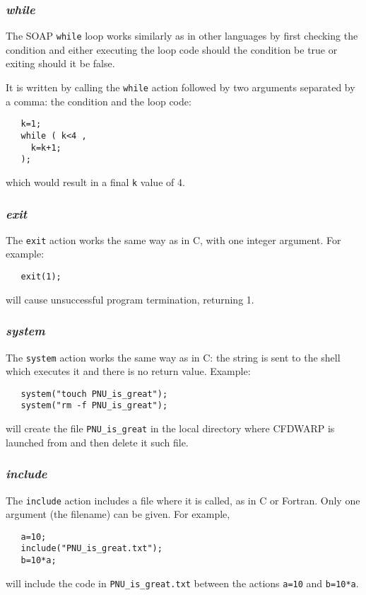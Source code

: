\documentclass{warpdoc}
\begin{document}
\subsubsection{\emph{while}}

The SOAP \verb|while| loop works similarly as in other languages
by first checking the condition and
either executing the loop code should the condition be true or exiting
should it be false.

It is written by calling the \verb|while| action followed by
two arguments separated by a comma: the condition and the loop code:
%
\begin{verbatim}
   k=1;
   while ( k<4 ,
     k=k+1;
   );
\end{verbatim}
%
which would result in a final \verb|k| value of 4.


\subsubsection{\emph{exit}}

The \verb|exit| action works the same way as in C, with one integer
argument. For example:
%
\begin{verbatim}
   exit(1);
\end{verbatim}
%
will cause unsuccessful program termination, returning 1.


\subsubsection{\emph{system}}

The \verb|system| action works the same way as in C: the string is sent to
the shell which executes it and there is no return value. Example:
%
\begin{verbatim}
   system("touch PNU_is_great");
   system("rm -f PNU_is_great");
\end{verbatim}
%
will create the file \verb|PNU_is_great| in the local directory where CFDWARP is launched from and then delete it such file. 


\subsubsection{\emph{include}}

The \verb|include| action includes a file where it is called, as in
C or Fortran. Only one argument (the filename) can be given. For example,
%
\begin{verbatim}
   a=10;
   include("PNU_is_great.txt");
   b=10*a;
\end{verbatim}
%
will include the code in \verb|PNU_is_great.txt|
between the actions \verb|a=10| and \verb|b=10*a|.
\end{document}
